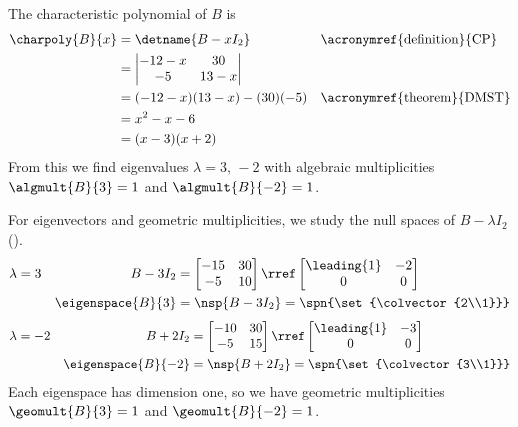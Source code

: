 The characteristic polynomial of $B$ is
%
\begin{align*}
\charpoly{B}{x}&=\detname{B-xI_2}&&\text{\acronymref{definition}{CP}}\\
&=
\begin{vmatrix}
-12-x&30\\-5&13-x
\end{vmatrix}\\
&=(-12-x)(13-x)-(30)(-5)&&\text{\acronymref{theorem}{DMST}}\\
&=x^2-x-6\\
&=(x-3)(x+2)
\end{align*}
%
From this we find eigenvalues $\lambda=3,\,-2$ with algebraic multiplicities $\algmult{B}{3}=1$ and $\algmult{B}{-2}=1$.\par
%
For eigenvectors and geometric multiplicities, we study the null spaces of $B-\lambda I_2$ ().
%
\begin{align*}
\lambda&=3&B-3I_2&=
\begin{bmatrix}
-15&30\\-5&10
\end{bmatrix}
\rref
\begin{bmatrix}
\leading{1} & -2 \\ 
0 & 0
\end{bmatrix}\\
&&\eigenspace{B}{3}&=\nsp{B-3I_2}=\spn{\set{\colvector{2\\1}}}
\end{align*}
%
\begin{align*}
\lambda&=-2&B+2I_2&=
\begin{bmatrix}
-10&30\\-5&15
\end{bmatrix}
\rref
\begin{bmatrix}
\leading{1} & -3 \\ 
0 & 0
\end{bmatrix}\\
&&\eigenspace{B}{-2}&=\nsp{B+2I_2}=\spn{\set{\colvector{3\\1}}}
\end{align*}
%
Each eigenspace has dimension one, so we have geometric multiplicities $\geomult{B}{3}=1$ and $\geomult{B}{-2}=1$.
